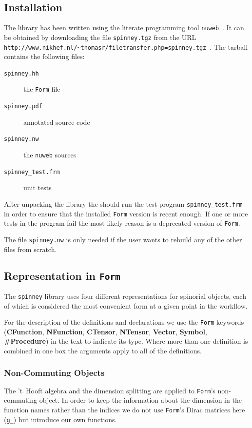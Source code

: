\documentclass[preprint,number,12pt,sort&compress]{elsarticle}
\newcommand{\FORM}{{\texttt{Form}}}
\begin{document}
\subsection{Installation}
The library has been written using the literate programming tool
\texttt{nuweb}~\cite{nuweb}. It can be obtained by downloading the file
\texttt{spinney.tgz} from the URL
\verb!http://www.nikhef.nl/~thomasr/filetransfer.php=spinney.tgz!\ .
The tarball contains the following files:
\begin{description}
\item[\texttt{spinney.hh}] the \FORM{} file
\item[\texttt{spinney.pdf}] annotated source code
\item[\texttt{spinney.nw}] the \texttt{nuweb} sources
\item[\texttt{spinney\_test.frm}] unit tests
\end{description}
After unpacking the library the should run the test program
\texttt{spinney\_test.frm} in order to ensure that the installed
\FORM{} version is recent enough. If one or more tests in the
program fail the most likely reason is a deprecated version of \FORM{}.

The file \texttt{spinney.nw} is only needed if the user wants to rebuild
any of the other files from scratch.

\subsection{Representation in \FORM}\label{ssec:representations}
The \texttt{spinney} library uses four different representations for
spinorial objects, each of which is considered the most convenient form at
a given point in the workflow.

For the description of the definitions and declarations we use the
\FORM{} keywords
(\textbf{CFunction}, \textbf{NFunction}, \textbf{CTensor}, \textbf{NTensor},
\textbf{Vector}, \textbf{Symbol}, \textbf{\#Procedure}) in the text to 
indicate its type. Where more than one definition is combined in one box
the arguments apply to all of the definitions.

\subsubsection{Non-Commuting Objects}
\label{ssec:noncommob}
The 't~Hooft algebra and the dimension splitting are applied to
\FORM{}'s non-commuting object. In order to keep the information about
the dimension in the function names rather than the indices we do not
use \FORM{}'s Dirac matrices here (\lstinline!g_!) but introduce our
own functions.
\end{document}
